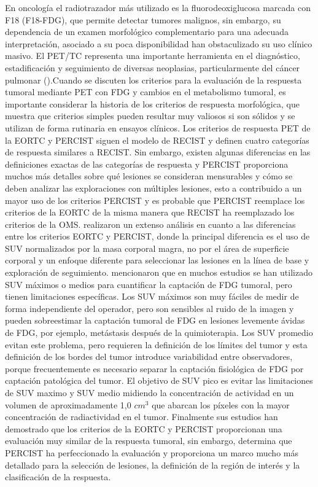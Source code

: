 \documentclass[11pt,a4paper,openany]{article}
\begin{document}
        En oncología el radiotrazador más utilizado es la fluorodeoxiglucosa marcada con F18 (F18-FDG), que permite detectar tumores malignos, sin embargo, su dependencia de un examen morfológico complementario para una adecuada interpretación, asociado a su poca disponibilidad han obstaculizado su uso clínico masivo. El PET/TC representa una importante herramienta en el diagnóstico, estadificación y seguimiento de diversas neoplasias, particularmente del cáncer pulmonar (\cite{Guevara2010}).Cuando se discuten los criterios para la evaluación de la respuesta tumoral mediante PET con FDG y cambios en el metabolismo tumoral, es importante considerar la historia de los criterios de respuesta morfológica, que muestra que criterios simples pueden resultar muy valiosos si son sólidos y se utilizan de forma rutinaria en ensayos clínicos. Los criterios de respuesta PET de la EORTC y PERCIST siguen el modelo de RECIST y definen cuatro categorías de respuesta similares a RECIST. Sin embargo, existen algunas diferencias en las definiciones exactas de las categorías de respuesta y PERCIST proporciona muchos más detalles sobre qué lesiones se consideran mensurables y cómo se deben analizar las exploraciones con múltiples lesiones, esto a contribuido a un mayor uso de los criterios PERCIST y es probable que PERCIST reemplace los criterios de la EORTC de la misma manera que RECIST ha reemplazado los criterios de la OMS. \cite{Pinker2017} realizaron  un extenso análisis en cuanto a las diferencias entre los criterios EORTC y PERCIST, donde la principal diferencia es el uso de SUV normalizados por la masa corporal magra, no por el área de superficie corporal y un enfoque diferente para seleccionar las lesiones en la línea de base y exploración de seguimiento. \cite{Pinker2017} mencionaron que en muchos estudios se han utilizado SUV máximos o medios para cuantificar la captación de FDG tumoral, pero tienen limitaciones específicas. Los SUV máximos son muy fáciles de medir de forma independiente del operador, pero son sensibles al ruido de la imagen y pueden sobreestimar la captación tumoral de FDG en lesiones levemente ávidas de FDG, por ejemplo, metástasis después de la quimioterapia. Los SUV promedio evitan este problema, pero requieren la definición de los límites del tumor y esta definición de los bordes del tumor introduce variabilidad entre observadores, porque frecuentemente es necesario separar la captación fisiológica de FDG por captación patológica del tumor. El objetivo de SUV pico es evitar las limitaciones de SUV maximo  y SUV medio midiendo la concentración de actividad en un volumen de aproximadamente 1,0 $cm^3$ que abarcan los píxeles con la mayor concentración de radiactividad en el tumor. Finalmente sus estudios han demostrado que los criterios de la EORTC y PERCIST proporcionan una evaluación muy similar de la respuesta tumoral, sin embargo, determina que PERCIST ha perfeccionado la evaluación y proporciona un marco mucho más detallado para la selección de lesiones, la definición de la región de interés y la clasificación de la respuesta.\\
 
\end{document}
